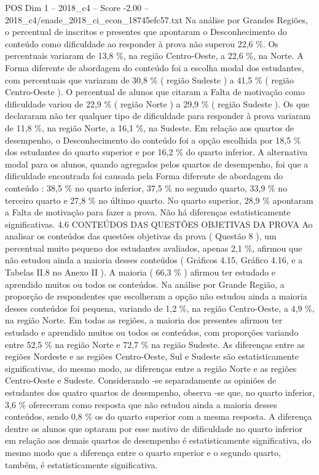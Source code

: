 \begin{textsample}{POS Dim 1 – 2018\_c4 – Score -2.00 – 2018\_c4/enade\_2018\_ci\_econ\_18745efc57.txt}
Na análise por Grandes Regiões, o percentual de inscritos e presentes que apontaram o Desconhecimento do conteúdo como dificuldade ao responder à prova não superou 22,6 \%.
Os percentuais variaram de 13,8 \%, na região Centro-Oeste, a 22,6 \%, na Norte.
A Forma diferente de abordagem do conteúdo foi a escolha modal dos estudantes, com percentuais que variaram de 30,8 \% ( região Sudeste ) a 41,5 \% ( região Centro-Oeste ).
O percentual de alunos que citaram a Falta de motivação como dificuldade variou de 22,9 \% ( região Norte ) a 29,9 \% ( região Sudeste ).
Os que declararam não ter qualquer tipo de dificuldade para responder à prova variaram de 11,8 \%, na região Norte, a 16,1 \%, na Sudeste.
Em relação aos quartos de desempenho, o Desconhecimento do conteúdo foi a opção escolhida por 18,5 \% dos estudantes do quarto superior e por 16,2 \% do quarto inferior.
A alternativa modal para os alunos, quando agregados pelos quartos de desempenho, foi que a dificuldade encontrada foi causada pela Forma diferente de abordagem do conteúdo : 38,5 \% no quarto inferior, 37,5 \% no segundo quarto, 33,9 \% no terceiro quarto e 27,8 \% no último quarto.
No quarto superior, 28,9 \% apontaram a Falta de motivação para fazer a prova.
Não há diferenças estatisticamente significativas. 4.6 CONTEÚDOS DAS QUESTÕES OBJETIVAS DA PROVA Ao analisar os conteúdos das questões objetivas da prova ( Questão 8 ), um percentual muito pequeno dos estudantes avaliados, apenas 2,1 \%, afirmou que não estudou ainda a maioria desses conteúdos ( Gráficos 4.15, Gráfico 4.16, e a Tabelas II.8 no Anexo II ).
A maioria ( 66,3 \% ) afirmou ter estudado e aprendido muitos ou todos os conteúdos.
Na análise por Grande Região, a proporção de respondentes que escolheram a opção não estudou ainda a maioria desses conteúdos foi pequena, variando de 1,2 \%, na região Centro-Oeste, a 4,9 \%, na região Norte.
Em todas as regiões, a maioria dos presentes afirmou ter estudado e aprendido muitos ou todos os conteúdos, com proporções variando entre 52,5 \% na região Norte e 72,7 \% na região Sudeste.
As diferenças entre as regiões Nordeste e as regiões Centro-Oeste, Sul e Sudeste são estatisticamente significativas, do mesmo modo, as diferenças entre a região Norte e as regiões Centro-Oeste e Sudeste.
Considerando -se separadamente as opiniões de estudantes dos quatro quartos de desempenho, observa -se que, no quarto inferior, 3,6 \% ofereceram como resposta que não estudou ainda a maioria desses conteúdos, sendo 0,8 \% os do quarto superior com a mesma resposta.
A diferença dentre os alunos que optaram por esse motivo de dificuldade no quarto inferior em relação aos demais quartos de desempenho é estatisticamente significativa, do mesmo modo que a diferença entre o quarto superior e o segundo quarto, também, é estatisticamente significativa.

\end{textsample}

